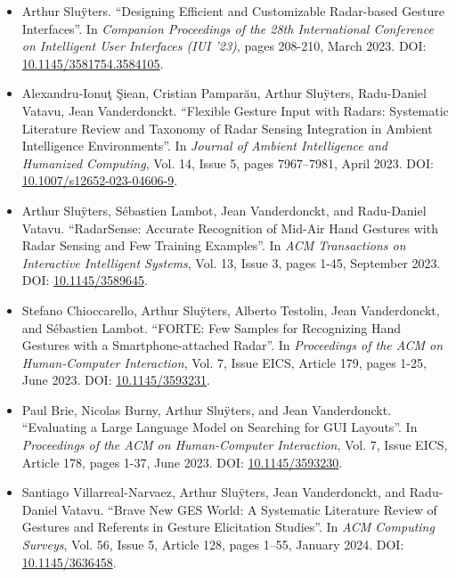 {\begin{itemize}
    \item Arthur Slu\"{y}ters. ``Designing Efficient and Customizable Radar-based Gesture Interfaces''. In \textit{Companion Proceedings of the 28th International Conference on Intelligent User Interfaces (IUI '23)}, pages 208-210, March 2023. DOI: \href{https://doi.org/10.1145/3581754.3584105}{10.1145/3581754.3584105}.

    \item Alexandru-Ionuţ Şiean, Cristian Pamparău, Arthur Slu\"{y}ters, Radu-Daniel Vatavu, Jean Vanderdonckt. ``Flexible Gesture Input with Radars: Systematic Literature Review and Taxonomy of Radar Sensing Integration in Ambient Intelligence Environments''. In \textit{Journal of Ambient Intelligence and Humanized Computing}, Vol. 14, Issue 5, pages 7967–7981, April 2023. DOI: \href{https://doi.org/10.1007/s12652-023-04606-9}{10.1007/s12652-023-04606-9}.

    \item Arthur Slu\"{y}ters, S\'{e}bastien Lambot, Jean Vanderdonckt, and Radu-Daniel Vatavu. ``RadarSense: Accurate Recognition of Mid-Air Hand Gestures with Radar Sensing and Few Training Examples''. In \textit{ACM Transactions on Interactive Intelligent Systems}, Vol. 13, Issue 3, pages 1-45, September 2023. DOI: \href{https://doi.org/10.1145/3589645}{10.1145/3589645}.

    \item Stefano Chioccarello, Arthur Slu\"{y}ters, Alberto Testolin, Jean Vanderdonckt, and S\'{e}bastien Lambot. ``FORTE: Few Samples for Recognizing Hand Gestures with a Smartphone-attached Radar''. In \textit{Proceedings of the ACM on Human-Computer Interaction}, Vol. 7, Issue EICS, Article 179, pages 1-25, June 2023. DOI: \href{https://doi.org/10.1145/3593231}{10.1145/3593231}.
    
    \item Paul Brie, Nicolas Burny, Arthur Slu\"{y}ters, and Jean Vanderdonckt. ``Evaluating a Large Language Model on Searching for GUI Layouts''. In \textit{Proceedings of the ACM on Human-Computer Interaction}, Vol. 7, Issue EICS, Article 178, pages 1-37, June 2023. DOI: \href{https://doi.org/10.1145/3593230}{10.1145/3593230}.
    
    \item Santiago Villarreal-Narvaez, Arthur Slu\"{y}ters, Jean Vanderdonckt, and Radu-Daniel Vatavu. ``Brave New GES World: A Systematic Literature Review of Gestures and Referents in Gesture Elicitation Studies''. In \textit{ACM Computing Surveys}, Vol. 56, Issue 5, Article 128, pages 1–55, January 2024. DOI: \href{https://doi.org/10.1145/3636458}{10.1145/3636458}.


\end{itemize}}
